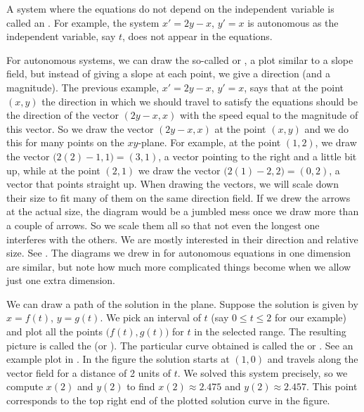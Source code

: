 A system where the equations do not depend on the independent variable
is called an \emph{}.  For example,
the system $x'=2y-x$, $y'=x$ is autonomous as
the independent
variable, say $t$, does not appear in the equations.

For autonomous systems, we can draw the so-called
\emph{} or \emph{},
a plot similar to a slope field, but
instead of giving a slope at each point, we give a direction (and a
magnitude).  The previous example, $x' = 2y-x$, $y' = x$, says
that at the point $(x,y)$ the direction in which we should travel to satisfy
the equations should be the direction of the vector $( 2y-x, x )$
with the speed equal to the magnitude of this vector.  So we draw
the vector $(2y-x,x)$ at the point $(x,y)$ and we do this for
many points on the $xy$-plane.
For example, at the point $(1,2)$, we draw the vector
$\bigl(2(2)-1,1\bigr) = (3,1)$,
a vector pointing to the right and a little bit up,
while at the point $(2,1)$ we draw the vector
$\bigl(2(1)-2,2\bigr) = (0,2)$,
a vector that points straight up.
When drawing the vectors, we will scale down
their size to fit many of them on the same direction field.
If we drew the arrows at the actual size, the diagram would be a
jumbled mess once we draw more than a couple of arrows.
So we scale them all so that not even the longest one interferes with
the others.
We are mostly 
interested in their direction and relative size.  See
.
The diagrams we drew in
for autonomous equations in one dimension
are similar,
but note how much more complicated things become when we
allow just one extra dimension.

We can draw a path of the solution in the plane.  Suppose the
solution is given by $x = f(t)$, $y=g(t)$.  We pick an interval
of $t$ (say $0 \leq t \leq 2$ for our example) and plot all the points
$\bigl(f(t),g(t)\bigr)$ for $t$ in the selected range.  The resulting picture is
called the \emph{}
(or ).
The particular curve obtained
is called the \emph{} or \emph{}.
See an example plot in .
In the figure the solution starts at $(1,0)$ and travels along the vector field
for a distance of 2 units of $t$.  We solved this system precisely, so
we compute $x(2)$ and $y(2)$ to find
$x(2) \approx 2.475$ and $y(2) \approx 2.457$.  This point corresponds
to the top right end of the plotted solution curve in the figure.

